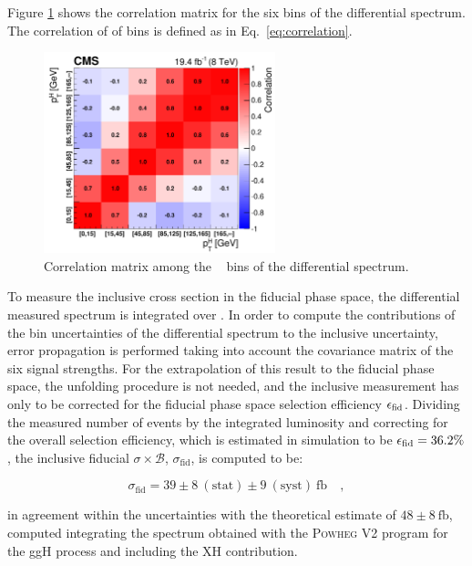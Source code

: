 Figure \ref{fig:cov_matrix} shows  the correlation matrix for the six bins of the differential spectrum. The correlation of of bins is defined as in Eq.~\eqref{eq:correlation}.

\begin{figure}[!h]
\centering
\includegraphics[width=0.6\textwidth]{images/unblinding/covMatrix.pdf}
\caption{Correlation matrix among the \pth~ bins of the differential spectrum.}\label{fig:cov_matrix}
\end{figure}

To measure the inclusive cross section in the fiducial phase space, the differential measured spectrum is integrated over \pth. In order to compute the contributions of the bin uncertainties of the differential spectrum to the inclusive uncertainty,  error propagation is performed taking into account the covariance matrix of the six signal strengths. For the extrapolation of this result to the fiducial phase space, the unfolding procedure is not needed, and the inclusive measurement has only to be corrected for the fiducial phase space selection efficiency $\epsilon_{\rm{fid}}$. Dividing the measured number of events by the integrated luminosity and correcting for the overall selection efficiency, which is estimated in simulation to be $\epsilon_{\rm{fid}} = 36.2 \%$, the inclusive fiducial $\sigma \times \mathcal{B}$, $\sigma_{\mathrm{fid}}$, is computed to be:

\begin{equation}
\sigma_{\mathrm{fid}} = 39\pm 8~(\mathrm{stat}) \pm 9~(\mathrm{syst})~\mathrm{fb} \quad ,
\end{equation} 

in agreement within the uncertainties with the theoretical estimate of $48 \pm 8 ~\mathrm{fb}$, computed integrating the spectrum obtained with the \textsc{Powheg V2} program for the ggH process and including the XH contribution.
